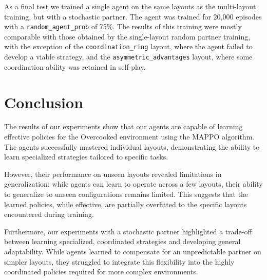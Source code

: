 \documentclass{article}
\begin{document}
As a final test we trained a single agent on the same layouts as the multi-layout training, but with a stochastic partner. The agent was trained for 20,000 episodes with a \texttt{random\_agent\_prob} of 75\%. The results of this training were mostly comparable with those obtained by the single-layout random partner training, with the exception of the \texttt{coordination\_ring} layout, where the agent failed to develop a viable strategy, and the \texttt{asymmetric\_advantages} layout, where some coordination ability was retained in self-play.

\section{Conclusion}
The results of our experiments show that our agents are capable of learning effective policies for the Overcooked environment using the MAPPO algorithm. The agents successfully mastered individual layouts, demonstrating the ability to learn specialized strategies tailored to specific tasks. 

However, their performance on unseen layouts revealed limitations in generalization: while agents can learn to operate across a few layouts, their ability to generalize to unseen configurations remains limited. This suggests that the learned policies, while effective, are partially overfitted to the specific layouts encountered during training.

Furthermore, our experiments with a stochastic partner highlighted a trade-off between learning specialized, coordinated strategies and developing general adaptability. While agents learned to compensate for an unpredictable partner on simpler layouts, they struggled to integrate this flexibility into the highly coordinated policies required for more complex environments.



\end{document}
